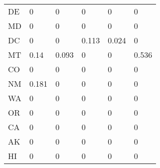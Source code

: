 \begin{table}[ht!]
\begin{tabular}{llllll}
DE          & 0               & 0              & 0               & 0                & 0               \\
MD          & 0               & 0              & 0               & 0                & 0               \\
DC          & 0               & 0              & 0.113           & 0.024            & 0               \\
MT          & 0.14            & 0.093          & 0               & 0                & 0.536           \\
CO          & 0               & 0              & 0               & 0                & 0               \\
NM          & 0.181           & 0              & 0               & 0                & 0               \\
WA          & 0               & 0              & 0               & 0                & 0               \\
OR          & 0               & 0              & 0               & 0                & 0               \\
CA          & 0               & 0              & 0               & 0                & 0               \\
AK          & 0               & 0              & 0               & 0                & 0               \\
HI          & 0               & 0              & 0               & 0                & 0\\
\hline
\end{tabular}
\end{table}
